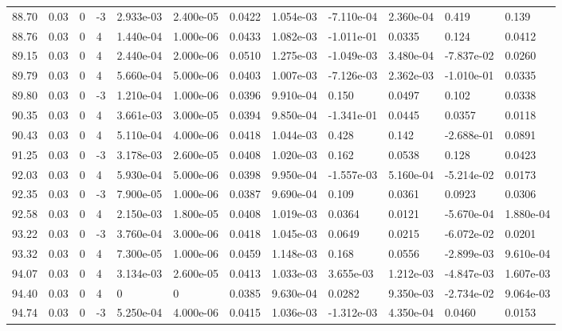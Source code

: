 \documentclass[preview]{standalone}
\begin{document}
{{{{{{\begin{tabular}{L{1.2cm}C{1.2cm} C{0.3cm}C{0.5cm} C{1.4cm}C{1.4cm} C{1.4cm}C{1.4cm} C{1.6cm}C{1.6cm} C{1.6cm}C{1.6cm}}
  88.70  &  0.03  & 0     & -3 &  2.933e-03  & 2.400e-05  &  0.0422&   1.054e-03& -7.110e-04 & 2.360e-04   &  0.419 & 0.139  \\ 
  88.76  &  0.03  & 0     &  4 &  1.440e-04  & 1.000e-06  &  0.0433&   1.082e-03& -1.011e-01 & 0.0335   &  0.124 & 0.0412  \\ 
  89.15  &  0.03  & 0     &  4 &  2.440e-04  & 2.000e-06  &  0.0510&   1.275e-03& -1.049e-03 & 3.480e-04   &  -7.837e-02 & 0.0260  \\ 
  89.79  &  0.03  & 0     &  4 &  5.660e-04  & 5.000e-06  &  0.0403&   1.007e-03& -7.126e-03 & 2.362e-03   &  -1.010e-01 & 0.0335  \\ 
  89.80  &  0.03  & 0     & -3 &  1.210e-04  & 1.000e-06  &  0.0396&   9.910e-04& 0.150 & 0.0497   &  0.102 & 0.0338  \\ 
  90.35  &  0.03  & 0     &  4 &  3.661e-03  & 3.000e-05  &  0.0394&   9.850e-04& -1.341e-01 & 0.0445   &  0.0357 & 0.0118  \\ 
  90.43  &  0.03  & 0     &  4 &  5.110e-04  & 4.000e-06  &  0.0418&   1.044e-03& 0.428 & 0.142   &  -2.688e-01 & 0.0891  \\ 
  91.25  &  0.03  & 0     & -3 &  3.178e-03  & 2.600e-05  &  0.0408&   1.020e-03& 0.162 & 0.0538   &  0.128 & 0.0423  \\ 
  92.03  &  0.03  & 0     &  4 &  5.930e-04  & 5.000e-06  &  0.0398&   9.950e-04& -1.557e-03 & 5.160e-04   &  -5.214e-02 & 0.0173  \\ 
  92.35  &  0.03  & 0     & -3 &  7.900e-05  & 1.000e-06  &  0.0387&   9.690e-04& 0.109 & 0.0361   &  0.0923 & 0.0306  \\ 
  92.58  &  0.03  & 0     &  4 &  2.150e-03  & 1.800e-05  &  0.0408&   1.019e-03& 0.0364 & 0.0121   &  -5.670e-04 & 1.880e-04  \\ 
  93.22  &  0.03  & 0     & -3 &  3.760e-04  & 3.000e-06  &  0.0418&   1.045e-03& 0.0649 & 0.0215   &  -6.072e-02 & 0.0201  \\ 
  93.32  &  0.03  & 0     &  4 &  7.300e-05  & 1.000e-06  &  0.0459&   1.148e-03& 0.168 & 0.0556   &  -2.899e-03 & 9.610e-04  \\ 
  94.07  &  0.03  & 0     &  4 &  3.134e-03  & 2.600e-05  &  0.0413&   1.033e-03& 3.655e-03 & 1.212e-03   &  -4.847e-03 & 1.607e-03  \\ 
  94.40  &  0.03  & 0     &  4 &  0  & 0  &  0.0385&   9.630e-04& 0.0282 & 9.350e-03   &  -2.734e-02 & 9.064e-03  \\ 
  94.74  &  0.03  & 0     & -3 &  5.250e-04  & 4.000e-06  &  0.0415&   1.036e-03& -1.312e-03 & 4.350e-04   &  0.0460 & 0.0153  \\ 

\end{tabular}}}}}}}
\end{document}

